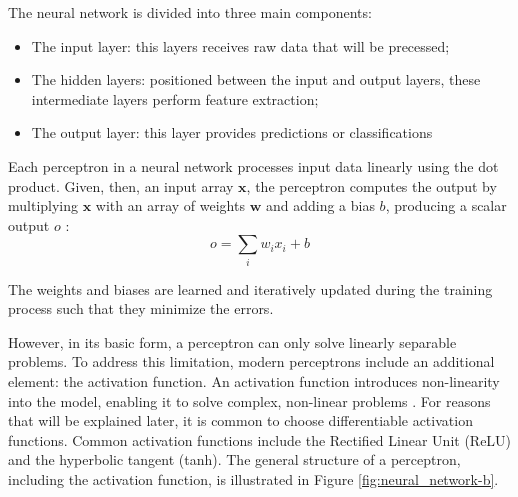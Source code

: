 The neural network is divided into three main components: 
\begin{itemize}
    \item The input layer: this layers receives raw data that will be precessed;
    \item The hidden layers: positioned between the input and output layers, these intermediate layers perform feature extraction;
    \item The output layer: this layer provides predictions or classifications
\end{itemize}

Each perceptron in a neural network processes input data linearly using the dot product. Given, then, an input array $\mathbf{x}$, the perceptron computes the output by multiplying $\mathbf{x}$ with an array of weights $\mathbf{w}$ and adding a bias $b$, producing a scalar output $o$ \cite{Gurney_1997}:
\begin{equation}
    o = \sum_{i}w_i x_i + b
\end{equation}

The weights and biases are learned and iteratively updated during the training process such that they minimize the errors.

However, in its basic form, a perceptron can only solve linearly separable problems. To address this limitation, modern perceptrons include an additional element: the activation function. An activation function introduces non-linearity into the model, enabling it to solve complex, non-linear problems \cite{Roth_2016}. For reasons that will be explained later, it is common to choose differentiable activation functions. Common activation functions include the Rectified Linear Unit (ReLU) and the hyperbolic tangent (tanh). The general structure of a perceptron, including the activation function, is illustrated in Figure \ref{fig:neural_network-b}.


